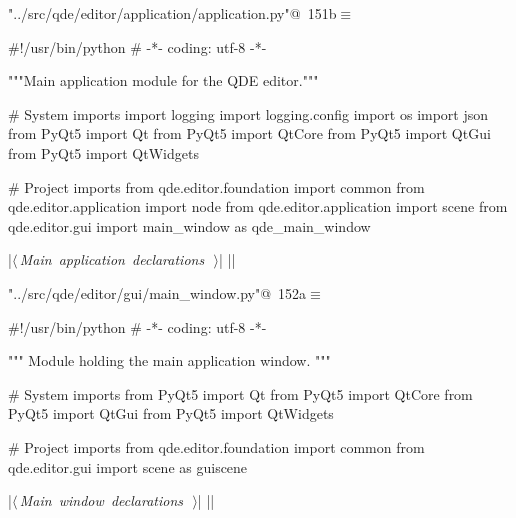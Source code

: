 \documentclass[%
    a4paper,    %
    justified,  %
    nobib,      %
    openany     %
]{tufte-book}
\begin{document}
\begin{flushleft} \small
\begin{minipage}{\linewidth}\label{scrap167}\raggedright\small
{} \verb@"../src/qde/editor/application/application.py"@\nobreak\ {\footnotesize {151b}}$\equiv$
\vspace{-1ex}
\begin{pythoncode}
#!/usr/bin/python
# -*- coding: utf-8 -*-

"""Main application module for the QDE editor."""

# System imports
import logging
import logging.config
import os
import json
from PyQt5 import Qt
from PyQt5 import QtCore
from PyQt5 import QtGui
from PyQt5 import QtWidgets

# Project imports
from qde.editor.foundation import common
from qde.editor.application import node
from qde.editor.application import scene
from qde.editor.gui import main_window as qde_main_window


|\hbox{$\langle\,${\itshape Main application declarations}\nobreak\ {\footnotesize {}}$\,\rangle$}|
|\NWsep|
\end{pythoncode}
\vspace{1.5ex}
\footnotesize
\begin{list}{}{\setlength{\itemsep}{-\parsep}\setlength{\itemindent}{-\leftmargin}}

\item{}
\end{list}
\end{minipage}\vspace{4ex}
\end{flushleft}
\begin{flushleft} \small
\begin{minipage}{\linewidth}\label{scrap168}\raggedright\small
{} \verb@"../src/qde/editor/gui/main_window.py"@\nobreak\ {\footnotesize {152a}}$\equiv$
\vspace{-1ex}
\begin{pythoncode}
#!/usr/bin/python
# -*- coding: utf-8 -*-

""" Module holding the main application window. """

# System imports
from PyQt5 import Qt
from PyQt5 import QtCore
from PyQt5 import QtGui
from PyQt5 import QtWidgets

# Project imports
from qde.editor.foundation import common
from qde.editor.gui import scene as guiscene


|\hbox{$\langle\,${\itshape Main window declarations}\nobreak\ {\footnotesize {}}$\,\rangle$}|
|\NWsep|
\end{pythoncode}
\vspace{1.5ex}
\footnotesize
\begin{list}{}{\setlength{\itemsep}{-\parsep}\setlength{\itemindent}{-\leftmargin}}

\item{}
\end{list}
\end{minipage}\vspace{4ex}
\end{flushleft}
\end{document}
